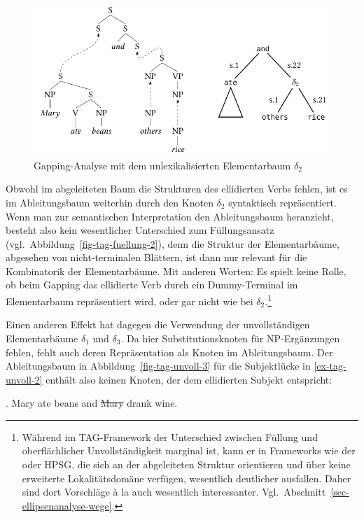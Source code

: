 \begin{figure}[t]
\centering
\includegraphics{graphics/abb831.pdf}
\caption{\label{fig-tag-unvoll-2}Gapping-Analyse mit dem unlexikalisierten Elementarbaum $\delta_2$}
\end{figure}
Obwohl im abgeleiteten Baum die Strukturen des ellidierten Verbs fehlen, ist es im Ableitungsbaum weiterhin durch den Knoten $\delta_2$ syntaktisch repräsentiert. Wenn man zur semantischen Interpretation den Ableitungsbaum heranzieht, besteht also kein wesentlicher Unterschied zum Füllungsansatz (vgl.\ Abbildung~\ref{fig-tag-fuellung-2}), denn die Struktur der Elementarbäume, abgesehen von nicht-terminalen Blättern, ist dann nur relevant für die Kombinatorik der Elementarbäume. Mit anderen Worten: Es spielt keine Rolle, ob beim Gapping das ellidierte Verb durch ein Dummy-Terminal im Elementarbaum repräsentiert wird, oder gar nicht wie bei $\delta_2$.\footnote{Während im TAG-Framework der Unterschied zwischen Füllung und oberflächlicher Unvollständigkeit marginal ist, kann er in Frameworks wie der  oder HPSG, die sich an der abgeleiteten Struktur orientieren und über keine erweiterte Lokalitätsdomäne verfügen, wesentlich deutlicher ausfallen. Daher sind dort Vorschläge \`a la \cite{Chao:87} auch wesentlich interessanter. Vgl.\ Abschnitt~\ref{sec-ellipsenanalyse-wege}.} 

Einen anderen Effekt hat dagegen die Verwendung der unvollständigen Elementarbäume $\delta_1$ und $\delta_3$. Da hier Substitutionsknoten für NP-Ergänzungen fehlen, fehlt auch deren Repräsentation als Knoten im Ableitungsbaum. Der Ableitungsbaum in Abbildung~\ref{fig-tag-unvoll-3} für die Subjektlücke in \ref{ex-tag-unvoll-2} enthält also keinen Knoten, der dem ellidierten Subjekt entspricht:

\ex. \label{ex-tag-unvoll-2} Mary ate beans and \sout{Mary} drank wine.

